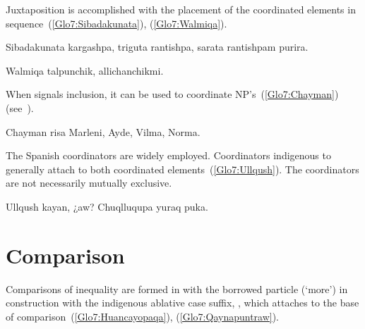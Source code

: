 \noindent
Juxtaposition is accomplished with the placement of the coordinated elements in sequence~(\ref{Glo7:Sibadakunata}), (\ref{Glo7:Walmiqa}).


%
{Sibadakunata kargashpa, triguta rantishpa, sarata rantishpam purira.}%
{}%
{}{}%

%
{Walmiqa talpunchik, allichanchikmi.}%
{}%
{}{}%

\noindent
When  signals inclusion, it can be used to coordinate NP’s~(\ref{Glo7:Chayman}) (see~).


%
{Chayman risa Marleni, Ayde, Vilma, Norma.}%
{}%
{}{}%

\noindent
The Spanish coordinators are widely employed. Coordinators indigenous to \SYQ{} generally attach to both coordinated elements~(\ref{Glo7:Ullqush}). The coordinators are not necessarily mutually exclusive.


%
{Ullqush kayan, ¿aw? Chuqlluqupa yuraq puka.}%
{}%
{}{}%

\section{Comparison}
Comparisons of inequality are formed in \SYQ{} with the borrowed particle  (‘more’) in construction with the indigenous ablative case suffix, , which attaches to the base of comparison~(\ref{Glo7:Huancayopaqa}), (\ref{Glo7:Qaynapuntraw}).


